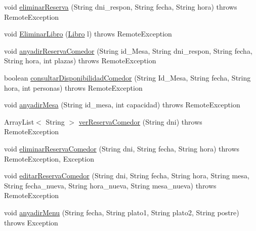 \begin{DoxyCompactItemize}
\item 
void \mbox{\hyperlink{interfacees_1_1deusto_1_1spq_1_1biblioteca_1_1remote_1_1_i_biblioteca_abb2449f5cc79a04e38cb5898cea35ffc}{eliminar\+Reserva}} (String dni\+\_\+respon, String fecha, String hora)  throws Remote\+Exception 
\item 
void \mbox{\hyperlink{interfacees_1_1deusto_1_1spq_1_1biblioteca_1_1remote_1_1_i_biblioteca_addbe4ccd7324f0302e25447f2be3403a}{Eliminar\+Libro}} (\mbox{\hyperlink{classes_1_1deusto_1_1spq_1_1biblioteca_1_1data_1_1_libro}{Libro}} l)  throws Remote\+Exception
\item 
void \mbox{\hyperlink{interfacees_1_1deusto_1_1spq_1_1biblioteca_1_1remote_1_1_i_biblioteca_a6e1aadce8e2f541702117bf54ed6a225}{anyadir\+Reserva\+Comedor}} (String id\+\_\+\+Mesa, String dni\+\_\+respon, String fecha, String hora, int plazas)  throws Remote\+Exception
\item 
boolean \mbox{\hyperlink{interfacees_1_1deusto_1_1spq_1_1biblioteca_1_1remote_1_1_i_biblioteca_ab6188ebc7f0b5e23bdfc9e4a86395373}{consultar\+Disponibilidad\+Comedor}} (String Id\+\_\+\+Mesa, String fecha, String hora, int personas)  throws Remote\+Exception
\item 
void \mbox{\hyperlink{interfacees_1_1deusto_1_1spq_1_1biblioteca_1_1remote_1_1_i_biblioteca_a99ba473aaaa6ff064cff2f354c3f64b3}{anyadir\+Mesa}} (String id\+\_\+mesa, int capacidad)  throws Remote\+Exception
\item 
Array\+List$<$ String $>$ \mbox{\hyperlink{interfacees_1_1deusto_1_1spq_1_1biblioteca_1_1remote_1_1_i_biblioteca_a95f0223ecd802f703977d838c72a93bf}{ver\+Reserva\+Comedor}} (String dni)  throws Remote\+Exception
\item 
void \mbox{\hyperlink{interfacees_1_1deusto_1_1spq_1_1biblioteca_1_1remote_1_1_i_biblioteca_a36db52ba728865b02b2f25024d942149}{eliminar\+Reserva\+Comedor}} (String dni, String fecha, String hora)  throws Remote\+Exception, Exception
\item 
void \mbox{\hyperlink{interfacees_1_1deusto_1_1spq_1_1biblioteca_1_1remote_1_1_i_biblioteca_ac492277af5ed00def28276cd8b0a5394}{editar\+Reserva\+Comedor}} (String dni, String fecha, String hora, String mesa, String fecha\+\_\+nueva, String hora\+\_\+nueva, String mesa\+\_\+nueva)  throws Remote\+Exception
\item 
void \mbox{\hyperlink{interfacees_1_1deusto_1_1spq_1_1biblioteca_1_1remote_1_1_i_biblioteca_a07c2558d19f41b795d00a7fd91783fb5}{anyadir\+Menu}} (String fecha, String plato1, String plato2, String postre)  throws Exception

\end{DoxyCompactItemize}
